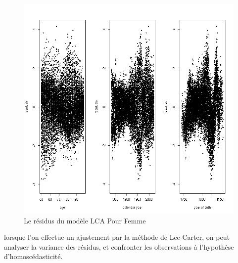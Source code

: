 \begin{figure}[!htb]
 \caption{Le résidus du modèle LCA Pour Femme}
    \centering
    \includegraphics[scale =0.55]{output_11_0.png}
\end{figure}

lorsque l’on effectue un ajustement par la méthode de Lee-Carter, on peut analyser la variance des résidus, et confronter les observations à l’hypothèse d’homoscédasticité.

